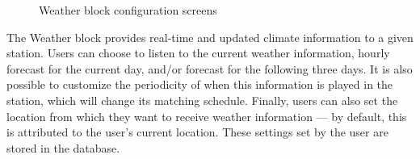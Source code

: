 \begin{figure}[htbp]
	\centering
	 \qquad
	 \qquad
	\caption{Weather block configuration screens}
	\label{fig:weather}
\end{figure}

The Weather block provides real-time and updated climate information to a given station. Users can choose to listen to the current weather information, hourly forecast for the current day, and/or forecast for the following three days. It is also possible to customize the periodicity of when this information is played in the station, which will change its matching schedule. Finally, users can also set the location from which they want to receive weather information — by default, this is attributed to the user's current location. These settings set by the user are stored in the database.

